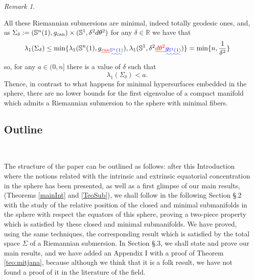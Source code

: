 \documentclass{amsart}
\theoremstyle{definition}
\theoremstyle{remark}
\newtheorem{remark}[theorem]{Remark}
\newcommand{\erre}{\mathbb{R}}
\providecommand{\DIFadd}[1]{{\protect\color{blue}\uwave{#1}}} %
\providecommand{\DIFdel}[1]{{\protect\color{red}\sout{#1}}}                      %
\providecommand{\DIFaddbegin}{} %
\providecommand{\DIFaddend}{} %
\providecommand{\DIFdelbegin}{} %
\providecommand{\DIFdelend}{} %
\begin{document}
\begin{remark}
\begin{enumerate}
$$$$
All these Riemannian submersions are minimal, indeed totally geodesic ones, and, as \DIFdelbegin \DIFdel{$\Sigma_\delta:=(\mathbb{S}^n(1),g_{\rm can}) \times (\mathbb{S}^1,\delta^2d\theta^2)$  }\DIFdelend \DIFaddbegin \DIFadd{$\Sigma_\delta:=(\mathbb{S}^n(1),g_{\mathbb{S}^{n}(1)}) \times (\mathbb{S}^1,\delta^2g_{\mathbb{S}^{1}(1)})$  }\DIFaddend for any $\delta \in \erre$ we have that
$$\lambda_1(\Sigma_\delta)\leq {\rm min}\{\lambda_1(\mathbb{S}^n(1),g\DIFdelbegin \DIFdel{_{\rm can}}\DIFdelend \DIFaddbegin \DIFadd{_{\mathbb{S}^{n}(1)}}\DIFaddend ),\lambda_1(\mathbb{S}^1,\delta^2\DIFdelbegin \DIFdel{d\theta^2}\DIFdelend \DIFaddbegin \DIFadd{g_{\mathbb{S}^{1}(1)}}\DIFaddend )\}={\rm min}\{n, \frac{1}{\delta^2}\}$$
\noindent so, for any $a\in (0,n]$ there is a value of $\delta$ such that
$$
\lambda_1(\Sigma_\delta)<a.
$$
Thence, in contrast to what happens for minimal hypersurfaces embedded in the sphere, there are no lower bounds for the first eigenvalue of a compact manifold which admits a Riemannian submersion to the sphere with minimal fibers.
\end{enumerate}
\end{remark}

\subsection{Outline}\

The structure of the paper can be outlined as follows: after this Introduction where the notions related with the intrinsic and extrinsic equatorial concentration in the sphere has been presented, as well as a first glimpse of our main results, (Theorems \ref{mainInt} and \ref{TeoSub}), we shall follow in the following Section \S.2 with the study of the relative position of the closed and minimal submanifolds in the sphere with respect the equators of this sphere, proving a two-piece property which is satisfied by these closed and minimal submanifolds. We have proved, using the same techniques, the corresponding result which is satisfied by the total space $\Sigma$ of a Riemannian submersion. In Section \S.3, we shall state and prove our main results, and we have added an Appendix I with a proof of Theorem \ref{teo:mitjana}, because although we think that it is a folk result, we have not found a proof of it in the literature of the field.
\end{document}
